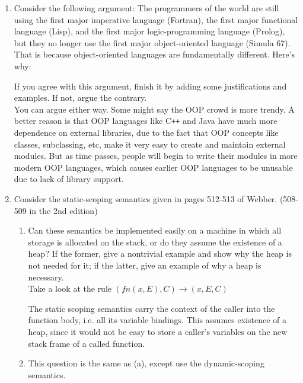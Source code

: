 \documentclass[10pt]{article}
\begin{document}
\begin{enumerate}
        \item Consider the following argument: The programmers of the world are still using the first major imperative language (Fortran),
        the first major functional language (Lisp), and the first major logic-programming language (Prolog), but they no longer use the first
        major object-oriented language (Simula 67). That is because object-oriented languages are fundamentally different. Here's why:

        If you agree with this argument, finish it by adding some justifications and examples. If not, argue the contrary.\\

        You can argue either way. Some might say the OOP crowd is more trendy. A better reason is that OOP languages like
        C\texttt{++} and Java have much more dependence on external libraries, due to the fact that OOP concepts like
        classes, subclassing, etc, make it very easy to create and maintain external modules. But as time passes, people will
        begin to write their modules in more modern OOP languages, which causes earlier OOP languages to be unusable
        due to lack of library support.

        \item Consider the static-scoping semantics given in pages 512-513 of Webber. (508-509 in the 2nd edition)

        \begin{enumerate}
                \item Can these semantics be implemented easily on a machine in which all storage is allocated on the stack, or do they
                assume the existence of a heap? If the former, give a nontrivial example and show why the heap is not needed for it;
                if the latter, give an example of why a heap is necessary.\\

                Take a look at the rule \((fn(x,E),C) \rightarrow (x,E,C)\)

                The static scoping semantics carry the context of the caller into the function body, i.e. all its variable bindings.
                This assumes existence of a heap, since it would not be easy to store a caller's variables on the new stack frame of
                a called function.

                \item This question is the same as (a), except use the dynamic-scoping semantics.\\


\end{enumerate}
\end{enumerate}
\end{document}
